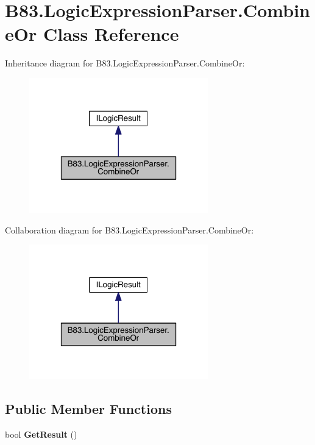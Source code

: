 \hypertarget{class_b83_1_1_logic_expression_parser_1_1_combine_or}{}\section{B83.\+Logic\+Expression\+Parser.\+Combine\+Or Class Reference}
\label{class_b83_1_1_logic_expression_parser_1_1_combine_or}


Inheritance diagram for B83.\+Logic\+Expression\+Parser.\+Combine\+Or\+:\nopagebreak
\begin{figure}[H]
\begin{center}
\leavevmode
\includegraphics[width=220pt]{class_b83_1_1_logic_expression_parser_1_1_combine_or__inherit__graph}
\end{center}
\end{figure}


Collaboration diagram for B83.\+Logic\+Expression\+Parser.\+Combine\+Or\+:\nopagebreak
\begin{figure}[H]
\begin{center}
\leavevmode
\includegraphics[width=220pt]{class_b83_1_1_logic_expression_parser_1_1_combine_or__coll__graph}
\end{center}
\end{figure}
\subsection*{Public Member Functions}
\begin{DoxyCompactItemize}
\item 
bool {\bfseries Get\+Result} ()\hypertarget{class_b83_1_1_logic_expression_parser_1_1_combine_or_a1c908a08374a66cbcfced23d29d494de}{}\label{class_b83_1_1_logic_expression_parser_1_1_combine_or_a1c908a08374a66cbcfced23d29d494de}

\end{DoxyCompactItemize}

